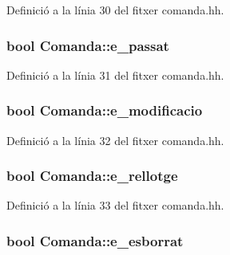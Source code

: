 Definició a la línia 30 del fitxer comanda.\+hh.

\hypertarget{class_comanda_a38e7cdf2003076cbe88461f03dc2106c}{}
\subsubsection[{e\+\_\+passat}]{\setlength{\rightskip}{0pt plus 5cm}bool Comanda\+::e\+\_\+passat\hspace{0.3cm}{\ttfamily [private]}}\label{class_comanda_a38e7cdf2003076cbe88461f03dc2106c}


Definició a la línia 31 del fitxer comanda.\+hh.

\hypertarget{class_comanda_a96d917429f6bfa73608d745ad1e1dfc7}{}
\subsubsection[{e\+\_\+modificacio}]{\setlength{\rightskip}{0pt plus 5cm}bool Comanda\+::e\+\_\+modificacio\hspace{0.3cm}{\ttfamily [private]}}\label{class_comanda_a96d917429f6bfa73608d745ad1e1dfc7}


Definició a la línia 32 del fitxer comanda.\+hh.

\hypertarget{class_comanda_ad73910246f9c47c887a3c01b53350282}{}
\subsubsection[{e\+\_\+rellotge}]{\setlength{\rightskip}{0pt plus 5cm}bool Comanda\+::e\+\_\+rellotge\hspace{0.3cm}{\ttfamily [private]}}\label{class_comanda_ad73910246f9c47c887a3c01b53350282}


Definició a la línia 33 del fitxer comanda.\+hh.

\hypertarget{class_comanda_a70a9790e90a45015dbcd4c6700ec0812}{}
\subsubsection[{e\+\_\+esborrat}]{\setlength{\rightskip}{0pt plus 5cm}bool Comanda\+::e\+\_\+esborrat\hspace{0.3cm}{\ttfamily [private]}}\label{class_comanda_a70a9790e90a45015dbcd4c6700ec0812}


